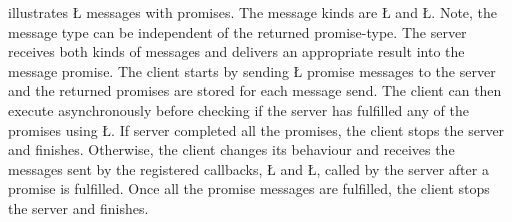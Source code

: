 \documentclass[openright,twoside]{report}
\begin{document}
 illustrates \LGinlinetrue\LGbegin\lgrinde\L{}\endlgrinde\LGend{} messages with promises.
The message kinds are \LGinlinetrue\LGbegin\lgrinde\L{}\endlgrinde\LGend{} and \LGinlinetrue\LGbegin\lgrinde\L{}\endlgrinde\LGend{}.
Note, the message type can be independent of the returned promise-type.
The server receives both kinds of messages and delivers an appropriate result into the message promise.
The client starts by sending \LGinlinetrue\LGbegin\lgrinde\L{}\endlgrinde\LGend{} promise messages to the server and the returned promises are stored for each message send.
The client can then execute asynchronously before checking if the server has fulfilled any of the promises using \LGinlinetrue\LGbegin\lgrinde\L{}\endlgrinde\LGend{}.
If server completed all the promises, the client stops the server and finishes.
Otherwise, the client changes its behaviour and receives the messages sent by the registered callbacks, \LGinlinetrue\LGbegin\lgrinde\L{}\endlgrinde\LGend{} and \LGinlinetrue\LGbegin\lgrinde\L{}\endlgrinde\LGend{}, called by the server after a promise is fulfilled.
Once all the promise messages are fulfilled, the client stops the server and finishes.
\end{document}
